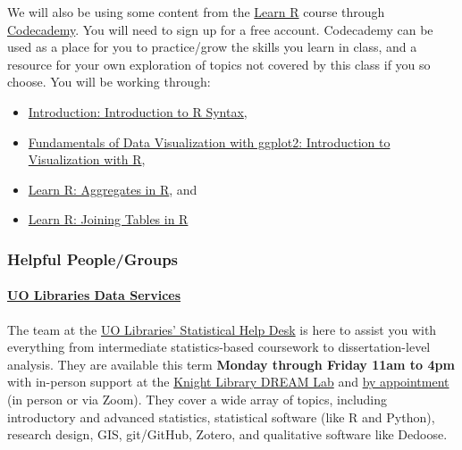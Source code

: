 \documentclass[
  letterpaper,
  DIV=11,
  numbers=noendperiod]{scrartcl}
\let\oldparagraph\paragraph
\renewcommand{\paragraph}[1]{\oldparagraph{#1}\mbox{}}
\providecommand{\tightlist}{%
  \setlength{\itemsep}{0pt}\setlength{\parskip}{0pt}}\usepackage{longtable,booktabs,array}
\begin{document}
We will also be using some content from the
\href{https://www.codecademy.com/learn/learn-r}{Learn R} course through
\href{https://www.codecademy.com/}{Codecademy}. You will need to sign up
for a free account. Codecademy can be used as a place for you to
practice/grow the skills you learn in class, and a resource for your own
exploration of topics not covered by this class if you so choose. You
will be working through:

\begin{itemize}
\tightlist
\item
  \href{https://www.codecademy.com/courses/learn-r/lessons/introduction-to-r/exercises/why-r}{Introduction:
  Introduction to R Syntax},
\item
  \href{https://www.codecademy.com/courses/learn-r/lessons/intro-visualization-ggplot2-r/exercises/layers-and-geoms}{Fundamentals
  of Data Visualization with ggplot2: Introduction to Visualization with
  R},
\item
  \href{https://www.codecademy.com/courses/learn-r/lessons/r-aggregates/exercises/column-statistics}{Learn
  R: Aggregates in R}, and
\item
  \href{https://www.codecademy.com/courses/learn-r/lessons/r-multiple-tables/exercises/introduction}{Learn
  R: Joining Tables in R}
\end{itemize}

\hypertarget{helpful-peoplegroups}{%
\subsubsection{Helpful People/Groups}\label{helpful-peoplegroups}}

\hypertarget{uo-libraries-data-services}{%
\paragraph{\texorpdfstring{\href{https://library.uoregon.edu/department-of-open-research/data-service}{UO
Libraries Data
Services}}{UO Libraries Data Services}}\label{uo-libraries-data-services}}

The team at the
\href{https://library.uoregon.edu/research-data-management/consultations}{UO
Libraries' Statistical Help Desk} is here to assist you with everything
from intermediate statistics-based coursework to dissertation-level
analysis. They are available this term \textbf{Monday through Friday
11am to 4pm} with in-person support at the
\href{https://map.uoregon.edu/f36893138}{Knight Library DREAM Lab} and
\href{https://uoregon.libcal.com/appointments?lid=916\&g=7803}{by
appointment} (in person or via Zoom). They cover a wide array of topics,
including introductory and advanced statistics, statistical software
(like R and Python), research design, GIS, git/GitHub, Zotero, and
qualitative software like Dedoose.
\end{document}

